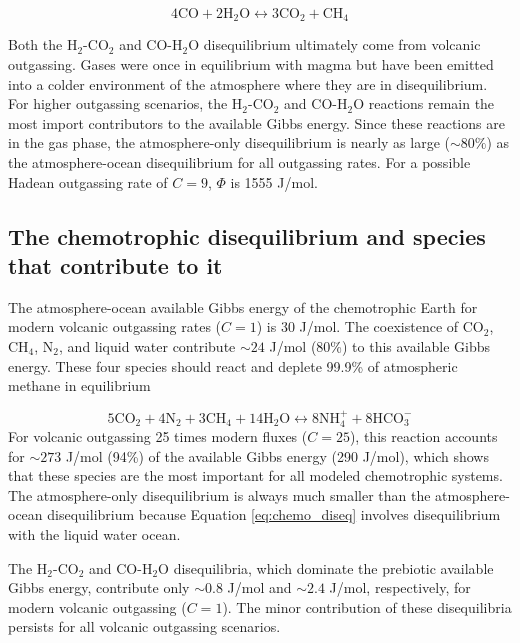 \begin{equation}
  4 \mathrm{CO} + 2 \mathrm{H_2O} \leftrightarrow 3 \mathrm{CO_2} + \mathrm{CH_4}
\end{equation}

Both the H$_2$-CO$_2$ and CO-H$_2$O disequilibrium ultimately come from volcanic outgassing. Gases were once in equilibrium with magma but have been emitted into a colder environment of the atmosphere where they are in disequilibrium. For higher outgassing scenarios, the H$_2$-CO$_2$ and CO-H$_2$O reactions remain the most import contributors to the available Gibbs energy. Since these reactions are in the gas phase, the atmosphere-only disequilibrium is nearly as large ($\sim 80\%$) as the atmosphere-ocean disequilibrium for all outgassing rates. For a possible Hadean outgassing rate of $C = 9$, $\Phi$ is 1555 J/mol.

\subsection{The chemotrophic disequilibrium and species that contribute to it}

The atmosphere-ocean available Gibbs energy of the chemotrophic Earth for modern volcanic outgassing rates ($C = 1$) is 30 J/mol. The coexistence of CO$_2$, CH$_4$, N$_2$, and liquid water contribute $\sim 24$ J/mol (80\%) to this available Gibbs energy. These four species should react and deplete 99.9\% of atmospheric methane in equilibrium

\begin{equation}
  \label{eq:chemo_diseq}
  5 \mathrm{CO_2} + 4 \mathrm{N_2} + 3 \mathrm{CH_4} + 14 \mathrm{H_2O} \leftrightarrow 8 \mathrm{NH_4^{+}} + 8 \mathrm{HCO_3^{-}}
\end{equation}
For volcanic outgassing 25 times modern fluxes ($C = 25$), this reaction accounts for $\sim 273$ J/mol (94\%) of the available Gibbs energy (290 J/mol), which shows that these species are the most important for all modeled chemotrophic systems. The atmosphere-only disequilibrium is always much smaller than the atmosphere-ocean disequilibrium because Equation \eqref{eq:chemo_diseq} involves disequilibrium with the liquid water ocean.

The H$_2$-CO$_2$ and CO-H$_2$O disequilibria, which dominate the prebiotic available Gibbs energy, contribute only $\sim 0.8$ J/mol and $\sim 2.4$ J/mol, respectively, for modern volcanic outgassing ($C = 1$). The minor contribution of these disequilibria persists for all volcanic outgassing scenarios.

